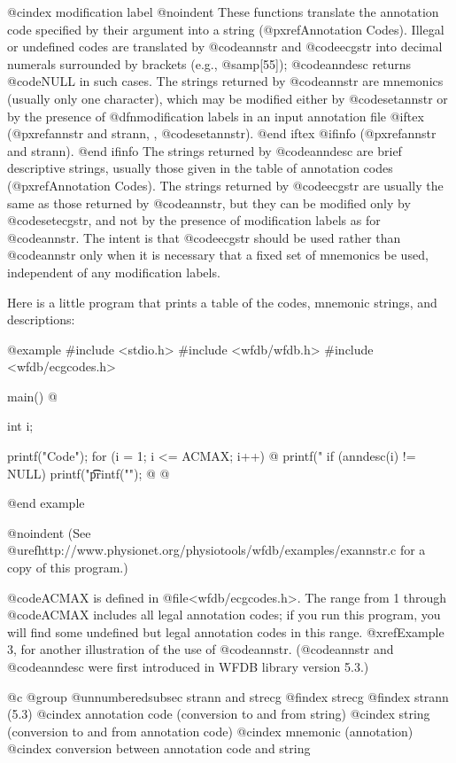 {{{{{{{{{@cindex modification label
@noindent
These functions translate the annotation code specified by their argument
into a string (@pxref{Annotation Codes}).  Illegal or undefined codes
are translated by @code{annstr} and @code{ecgstr} into decimal numerals
surrounded by brackets (e.g., @samp{[55]}); @code{anndesc} returns @code{NULL}
in such cases.  The strings returned by @code{annstr} are mnemonics
(usually only one character), which may be modified either by @code{setannstr}
or by the presence of @dfn{modification labels} in an input annotation file
@iftex
(@pxref{annstr and strann, , @code{setannstr}}).
@end iftex
@ifinfo
(@pxref{annstr and strann}).
@end ifinfo
The strings returned by @code{anndesc} are brief descriptive strings,
usually those given in the table of annotation codes
(@pxref{Annotation Codes}).  The strings returned by
@code{ecgstr} are usually the same as those returned by @code{annstr},
but they can be modified only by @code{setecgstr}, and not by the
presence of modification labels as for @code{annstr}.  The intent is
that @code{ecgstr} should be used rather than @code{annstr} only when
it is necessary that a fixed set of mnemonics be used, independent of
any modification labels.

Here is a little program that prints a table of the codes, mnemonic
strings, and descriptions:

@example
#include <stdio.h>
#include <wfdb/wfdb.h>
#include <wfdb/ecgcodes.h>

main()
@{
    int i;

    printf("Code\tMnemonic\tDescription\n");
    for (i = 1; i <= ACMAX; i++) @{
        printf("%
        if (anndesc(i) != NULL)
            printf("\t\t%
        printf("\n");
    @}
@}
@end example

@noindent
(See @uref{http://www.physionet.org/physiotools/wfdb/examples/exannstr.c}
for a copy of this program.)

@code{ACMAX} is defined in @file{<wfdb/ecgcodes.h>}.  The range from 1
through @code{ACMAX} includes all legal annotation codes; if you run
this program, you will find some undefined but legal annotation codes in
this range. @xref{Example 3}, for another illustration of the use of
@code{annstr}.  (@code{annstr} and @code{anndesc} were first introduced
in WFDB library version 5.3.)

@c @group
@unnumberedsubsec strann and strecg
@findex strecg
@findex strann (5.3)
@cindex annotation code (conversion to and from string)
@cindex string (conversion to and from annotation code)
@cindex mnemonic (annotation)
@cindex conversion between annotation code and string

}}}}}}}}}
